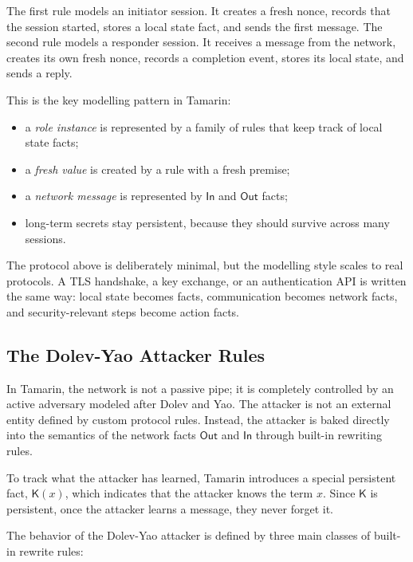 The first rule models an initiator session.  It creates a fresh nonce, records
that the session started, stores a local state fact, and sends the first
message.  The second rule models a responder session.  It receives a message
from the network, creates its own fresh nonce, records a completion event,
stores its local state, and sends a reply.

This is the key modelling pattern in Tamarin:
\begin{itemize}
  \item a \emph{role instance} is represented by a family of rules that keep
        track of local state facts;
  \item a \emph{fresh value} is created by a rule with a fresh premise;
  \item a \emph{network message} is represented by $\mathsf{In}$ and
        $\mathsf{Out}$ facts;
  \item long-term secrets stay persistent, because they should survive across
        many sessions.
\end{itemize}

\medskip\noindent
The protocol above is deliberately minimal, but the modelling style scales to
real protocols.  A TLS handshake, a key exchange, or an authentication API is
written the same way: local state becomes facts, communication becomes
network facts, and security-relevant steps become action facts.


\subsection{The Dolev-Yao Attacker Rules}

In Tamarin, the network is not a passive pipe; it is completely controlled by an active adversary modeled after Dolev and Yao. The attacker is not an external entity defined by custom protocol rules. Instead, the attacker is baked directly into the semantics of the network facts $\mathsf{Out}$ and $\mathsf{In}$ through built-in rewriting rules.

To track what the attacker has learned, Tamarin introduces a special persistent fact, $\mathsf{K}(x)$, which indicates that the attacker knows the term $x$. Since $\mathsf{K}$ is persistent, once the attacker learns a message, they never forget it.

The behavior of the Dolev-Yao attacker is defined by three main classes of built-in rewrite rules:

